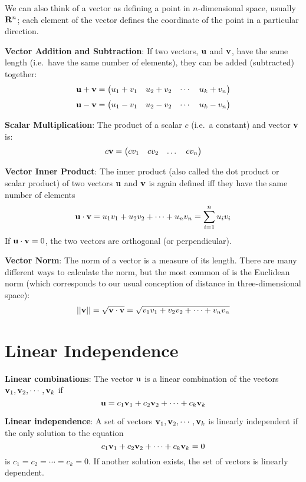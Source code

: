 \documentclass[]{book}
\theoremstyle{definition}
\theoremstyle{definition}
\theoremstyle{definition}
\theoremstyle{remark}
\begin{document}
We can also think of a vector as defining a point in \(n\)-dimensional
space, usually \({\bf R}^n\); each element of the vector defines the
coordinate of the point in a particular direction.

\textbf{Vector Addition and Subtraction}: If two vectors, \({\bf u}\)
and \({\bf v}\), have the same length (i.e.~have the same number of
elements), they can be added (subtracted) together:
\[ {\bf u} + {\bf v} = \begin{pmatrix} u_1 + v_1 & u_2 + v_2 & \cdots & u_k + v_n \end{pmatrix}\]
\[ {\bf u} - {\bf v} = \begin{pmatrix} u_1 - v_1 & u_2 - v_2 & \cdots & u_k - v_n \end{pmatrix}\]

\textbf{Scalar Multiplication}: The product of a scalar \(c\) (i.e.~a
constant) and vector \({\bf v}\) is:\\
\[ c{\bf v} =  \begin{pmatrix} cv_1 & cv_2 & \dots & cv_n \end{pmatrix} \]

\textbf{Vector Inner Product}: The inner product (also called the dot
product or scalar product) of two vectors \({\bf u}\) and \({\bf v}\) is
again defined iff they have the same number of elements
\[ {\bf u} \cdot {\bf v} = u_1v_1 + u_2v_2 + \cdots + u_nv_n = \sum_{i = 1}^n u_iv_i\]
If \({\bf u} \cdot {\bf v} = 0\), the two vectors are orthogonal (or
perpendicular).

\textbf{Vector Norm}: The norm of a vector is a measure of its length.
There are many different ways to calculate the norm, but the most common
of is the Euclidean norm (which corresponds to our usual conception of
distance in three-dimensional space):
\[ ||{\bf v}|| = \sqrt{{\bf v}\cdot{\bf v}} = \sqrt{ v_1v_1 + v_2v_2 + \cdots + v_nv_n}\]

\section{Linear Independence}\label{linear-independence}

\textbf{Linear combinations}: The vector \({\bf u}\) is a linear
combination of the vectors \({\bf v}_1, {\bf v}_2, \cdots , {\bf v}_k\)
if \[{\bf u} = c_1{\bf v}_1 + c_2{\bf v}_2 +  \cdots + c_k{\bf v}_k\]

\textbf{Linear independence}: A set of vectors
\({\bf v}_1, {\bf v}_2, \cdots , {\bf v}_k\) is linearly independent if
the only solution to the equation
\[c_1{\bf v}_1 + c_2{\bf v}_2 +  \cdots + c_k{\bf v}_k = 0\] is
\(c_1 = c_2 = \cdots = c_k = 0\). If another solution exists, the set of
vectors is linearly dependent.
\end{document}
